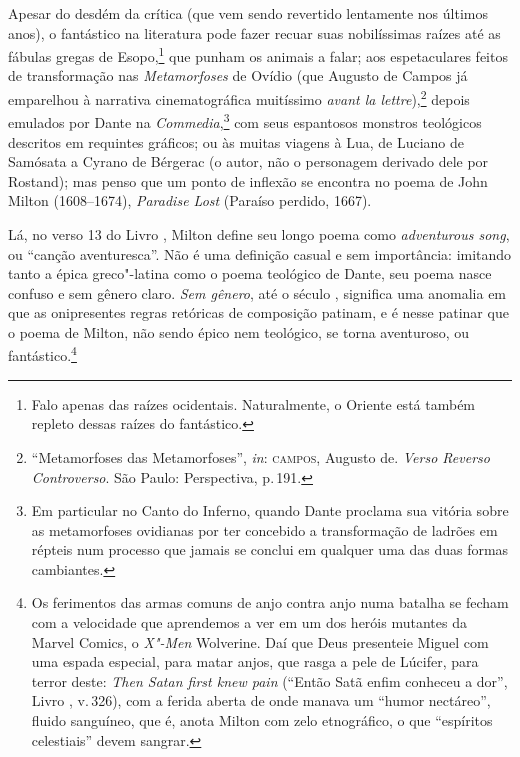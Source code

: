 Apesar do desdém da crítica (que vem sendo revertido lentamente nos
últimos anos), o fantástico na literatura pode fazer recuar suas
nobilíssimas raízes até as fábulas gregas de Esopo,\footnote{Falo apenas
  das raízes ocidentais. Naturalmente, o Oriente está também repleto
  dessas raízes do fantástico.} que punham os animais a falar; aos
espetaculares feitos de transformação nas \emph{Metamorfoses} de Ovídio
(que Augusto de Campos já emparelhou à narrativa cinematográfica
muitíssimo \emph{avant la lettre}),\footnote{``Metamorfoses das
  Metamorfoses'', \emph{in}: \textsc{campos}, Augusto de. \emph{Verso Reverso
  Controverso}. São Paulo: Perspectiva, p.\,191.} depois emulados por
Dante na \emph{Commedia},\footnote{Em particular no Canto  do Inferno,
  quando Dante proclama sua vitória sobre as metamorfoses ovidianas por
  ter concebido a transformação de ladrões em répteis num processo que
  jamais se conclui em qualquer uma das duas formas cambiantes.} com
seus espantosos monstros teológicos descritos em requintes gráficos; ou
às muitas viagens à Lua, de Luciano de Samósata a Cyrano de Bérgerac (o
autor, não o personagem derivado dele por Rostand); mas penso que um
ponto de inflexão se encontra no poema de John Milton (1608--1674),
\emph{Paradise Lost} (Paraíso perdido, 1667).

Lá, no verso 13 do Livro , Milton define seu longo poema como
\emph{adventurous song}, ou ``canção aventuresca''. Não é uma definição
casual e sem importância: imitando tanto a épica greco"-latina como o
poema teológico de Dante, seu poema nasce confuso e sem gênero claro.
\emph{Sem gênero}, até o século , significa uma anomalia em que as
onipresentes regras retóricas de composição patinam, e é nesse patinar
que o poema de Milton, não sendo épico nem teológico, se torna
aventuroso, ou fantástico.\footnote{Os ferimentos das armas comuns de
  anjo contra anjo numa batalha se fecham com a velocidade que
  aprendemos a ver em um dos heróis mutantes da Marvel Comics, o
  \emph{X"-Men} Wolverine. Daí que Deus presenteie Miguel com uma espada
  especial, para matar anjos, que rasga a pele de Lúcifer, para terror
  deste: \emph{Then Satan first knew pain} (``Então Satã enfim conheceu
  a dor'', Livro , v.\,326), com a ferida aberta de onde manava um
  ``humor nectáreo'', fluido sanguíneo, que é, anota Milton com zelo
  etnográfico, o que ``espíritos celestiais'' devem sangrar.}

